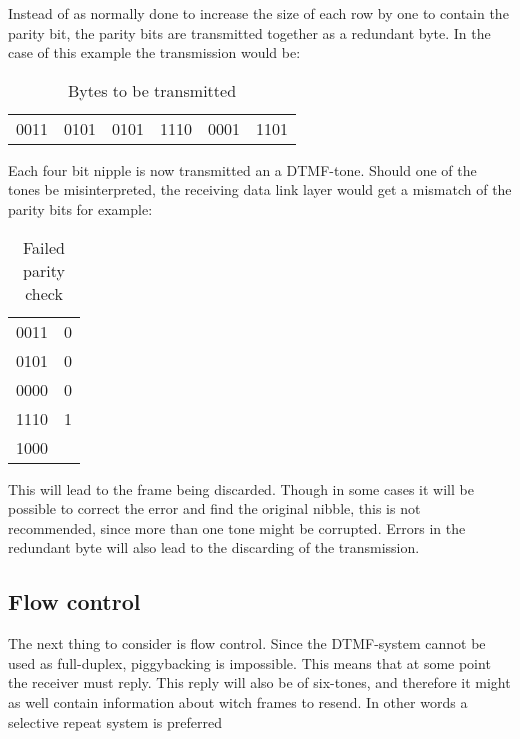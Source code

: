 Instead of as normally done to increase the size of each row by one to contain
the parity bit, the parity bits are transmitted together as a redundant byte. In
the case of this example the transmission would be:

\begin{table}[htb]
	\begin{center}
	\begin{tabular}{c|c|c|c|c|c}
	0011 & 0101 & 0101 & 1110 & 0001 & 1101 \\
	\end{tabular}
	\end{center}
	\caption{Bytes to be transmitted}
	\label{tab:bytes_to_be_transmitted}
\end{table}

Each four bit nipple is now transmitted an a DTMF-tone. Should one of the tones
be misinterpreted, the receiving data link layer would get a mismatch of the
parity bits for example:

\begin{table}[htb]
	\begin{center}
	\begin{tabular}{c|c}
	0011 & 0 \\
	0101 & 0 \\
	0000 & 0 \\
	1110 & 1 \\
	\hline
	1000 & \\
	\end{tabular}
	\end{center}
	\caption{Failed parity check}
	\label{tab:failed_parity_check}
\end{table}

This will lead to the frame being discarded. Though in some cases it will be
possible to correct the error and find the original nibble, this is not
recommended, since more than one tone might be corrupted. Errors in the
redundant byte will also lead to the discarding of the transmission.

\subsection{Flow control}
The next thing to consider is flow control. Since the DTMF-system
cannot be used as full-duplex, piggybacking is impossible. This means that at
some point the receiver must reply. This reply will also be of six-tones, and
therefore it might as well contain information about witch frames to resend. In
other words a selective repeat system is preferred

